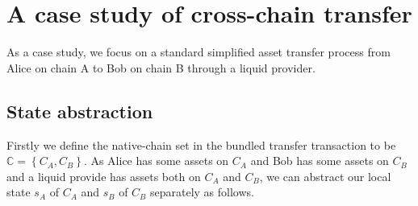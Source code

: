 \documentclass[pageno]{jpaper}
\begin{document}
\section{A case study of cross-chain transfer}
As a case study, we focus on a standard simplified asset transfer process from Alice on chain A to Bob on chain B through a liquid provider. 
\subsection{State abstraction}
Firstly we define the native-chain set in the bundled transfer transaction to be $\mathbb{C} = \left\{C_A, C_B\right\}$. As Alice has some assets on $C_A$ and Bob has some assets on $C_B$ and a liquid provide has assets both on $C_A$ and $C_B$, we can abstract our local state $s_A$ of $C_A$ and $s_B$ of $C_B$ separately as follows.
\end{document}
